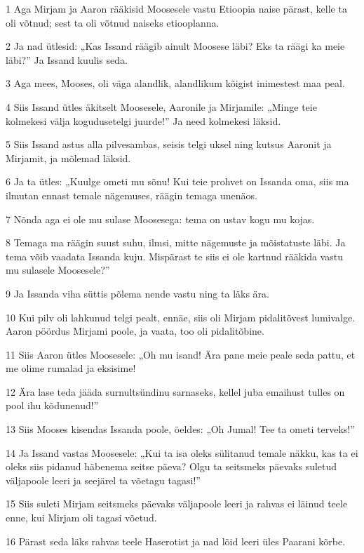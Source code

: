 \par 1 Aga Mirjam ja Aaron rääkisid Moosesele vastu Etioopia naise pärast, kelle ta oli võtnud; sest ta oli võtnud naiseks etiooplanna.
\par 2 Ja nad ütlesid: „Kas Issand räägib ainult Moosese läbi? Eks ta räägi ka meie läbi?” Ja Issand kuulis seda.
\par 3 Aga mees, Mooses, oli väga alandlik, alandlikum kõigist inimestest maa peal.
\par 4 Siis Issand ütles äkitselt Moosesele, Aaronile ja Mirjamile: „Minge teie kolmekesi välja kogudusetelgi juurde!” Ja need kolmekesi läksid.
\par 5 Siis Issand astus alla pilvesambas, seisis telgi uksel ning kutsus Aaronit ja Mirjamit, ja mõlemad läksid.
\par 6 Ja ta ütles: „Kuulge ometi mu sõnu! Kui teie prohvet on Issanda oma, siis ma ilmutan ennast temale nägemuses, räägin temaga unenäos.
\par 7 Nõnda aga ei ole mu sulase Moosesega: tema on ustav kogu mu kojas.
\par 8 Temaga ma räägin suust suhu, ilmsi, mitte nägemuste ja mõistatuste läbi. Ja tema võib vaadata Issanda kuju. Mispärast te siis ei ole kartnud rääkida vastu mu sulasele Moosesele?”
\par 9 Ja Issanda viha süttis põlema nende vastu ning ta läks ära.
\par 10 Kui pilv oli lahkunud telgi pealt, ennäe, siis oli Mirjam pidalitõvest lumivalge. Aaron pöördus Mirjami poole, ja vaata, too oli pidalitõbine.
\par 11 Siis Aaron ütles Moosesele: „Oh mu isand! Ära pane meie peale seda pattu, et me olime rumalad ja eksisime!
\par 12 Ära lase teda jääda surnultsündinu sarnaseks, kellel juba emaihust tulles on pool ihu kõdunenud!”
\par 13 Siis Mooses kisendas Issanda poole, öeldes: „Oh Jumal! Tee ta ometi terveks!”
\par 14 Ja Issand vastas Moosesele: „Kui ta isa oleks sülitanud temale näkku, kas ta ei oleks siis pidanud häbenema seitse päeva? Olgu ta seitsmeks päevaks suletud väljapoole leeri ja seejärel ta võetagu tagasi!”
\par 15 Siis suleti Mirjam seitsmeks päevaks väljapoole leeri ja rahvas ei läinud teele enne, kui Mirjam oli tagasi võetud.
\par 16 Pärast seda läks rahvas teele Haserotist ja nad lõid leeri üles Paarani kõrbe.

